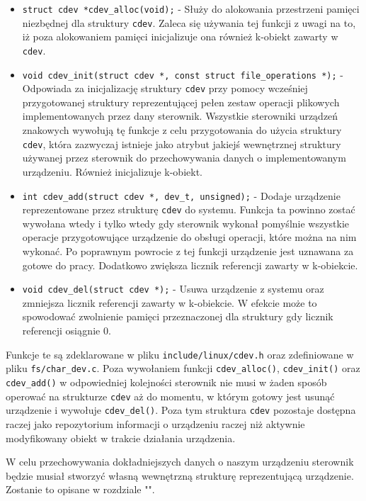 \documentclass[10pt]{scrartcl}
\begin{document}
\begin{itemize}
\item
  \texttt{struct cdev *cdev\_alloc(void);} - Służy do alokowania przestrzeni pamięci niezbędnej dla struktury \texttt{cdev}. Zaleca się używania tej funkcji z uwagi na to, iż poza alokowaniem pamięci inicjalizuje ona również k-obiekt zawarty w \texttt{cdev}.
\item
  \texttt{void cdev\_init(struct cdev *, const struct file\_operations *);} - Odpowiada za inicjalizację struktury \texttt{cdev} przy pomocy wcześniej przygotowanej struktury reprezentującej pełen zestaw operacji plikowych implementowanych przez dany sterownik. Wszystkie sterowniki urządzeń znakowych wywołują tę funkcje z celu przygotowania do użycia struktury \texttt{cdev}, która zazwyczaj istnieje jako atrybut jakiejś wewnętrznej struktury używanej przez sterownik do przechowywania danych o implementowanym urządzeniu. Również inicjalizuje k-obiekt.
\item
  \texttt{int cdev\_add(struct cdev *, dev\_t, unsigned);} - Dodaje urządzenie reprezentowane przez strukturę \texttt{cdev} do systemu.  Funkcja ta powinno zostać wywołana wtedy i tylko wtedy gdy sterownik wykonał pomyślnie wszystkie operacje przygotowujące urządzenie do obsługi operacji, które można na nim wykonać. Po poprawnym powrocie z tej funkcji urządzenie jest uznawana za gotowe do pracy. Dodatkowo zwiększa licznik referencji zawarty w k-obiekcie.
\item
  \texttt{void cdev\_del(struct cdev *);} - Usuwa urządzenie z systemu oraz zmniejsza licznik referencji zawarty w k-obiekcie. W efekcie może to spowodować zwolnienie pamięci przeznaczonej dla struktury gdy licznik referencji osiągnie 0.
\end{itemize}

Funkcje te są zdeklarowane w pliku \texttt{include/linux/cdev.h} oraz zdefiniowane w pliku \texttt{fs/char\_dev.c}. Poza wywołaniem funkcji \texttt{cdev\_alloc()}, \texttt{cdev\_init()} oraz \texttt{cdev\_add()} w odpowiedniej kolejności sterownik nie musi w żaden sposób operować na strukturze \texttt{cdev} aż do momentu, w którym gotowy jest usunąć urządzenie i wywołuje \texttt{cdev\_del()}. Poza tym struktura \texttt{cdev} pozostaje dostępna raczej jako repozytorium informacji o urządzeniu raczej niż aktywnie modyfikowany obiekt w trakcie działania urządzenia.

W celu przechowywania dokładniejszych danych o naszym urządzeniu sterownik będzie musiał stworzyć własną wewnętrzną strukturę reprezentującą urządzenie. Zostanie to opisane w rozdziale "".
\end{document}
